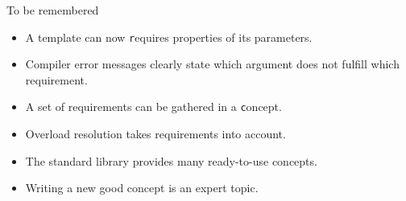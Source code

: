 \begin{frame}[fragile]
    \begin{block}{To be remembered}
      \begin{itemize}
      \item A template can now {\texttt requires} properties of its parameters.
      \item Compiler error messages clearly state which argument does not fulfill which requirement.
      \item A set of requirements can be gathered in a {\texttt concept}.
      \item Overload resolution takes requirements into account.
      \item The standard library provides many ready-to-use concepts.
      \item Writing a new good concept is an expert topic.
      \end{itemize}
    \end{block}
\end{frame}
